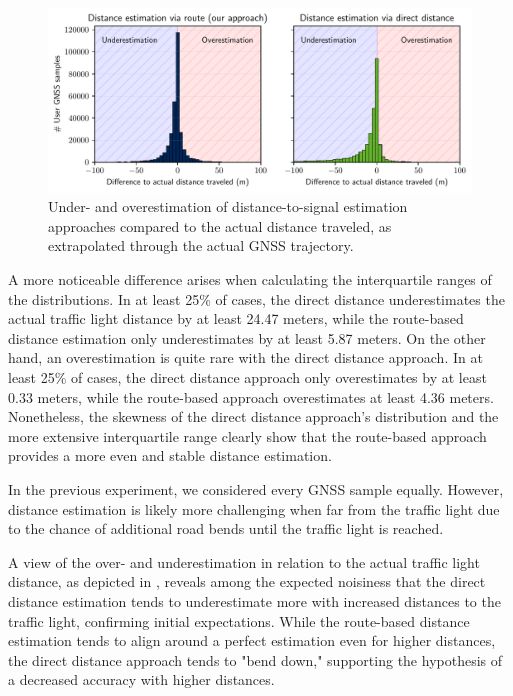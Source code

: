 \begin{figure}[t]
\centering 
\includegraphics[width=\linewidth]{images/routing-distance-distribution.pdf}
\caption{Under- and overestimation of distance-to-signal estimation approaches compared to the actual distance traveled, as extrapolated through the actual GNSS trajectory.}
\label{fig:routing-distance-distribution}
\end{figure}

A more noticeable difference arises when calculating the interquartile ranges of the distributions. In at least 25\% of cases, the direct distance underestimates the actual traffic light distance by at least 24.47 meters, while the route-based distance estimation only underestimates by at least 5.87 meters. On the other hand, an overestimation is quite rare with the direct distance approach. In at least 25\% of cases, the direct distance approach only overestimates by at least 0.33 meters, while the route-based approach overestimates at least 4.36 meters. Nonetheless, the skewness of the direct distance approach's distribution and the more extensive interquartile range clearly show that the route-based approach provides a more even and stable distance estimation.

In the previous experiment, we considered every GNSS sample equally. However, distance estimation is likely more challenging when far from the traffic light due to the chance of additional road bends until the traffic light is reached. 

A view of the over- and underestimation in relation to the actual traffic light distance, as depicted in , reveals among the expected noisiness that the direct distance estimation tends to underestimate more with increased distances to the traffic light, confirming initial expectations. While the route-based distance estimation tends to align around a perfect estimation even for higher distances, the direct distance approach tends to "bend down," supporting the hypothesis of a decreased accuracy with higher distances. 

